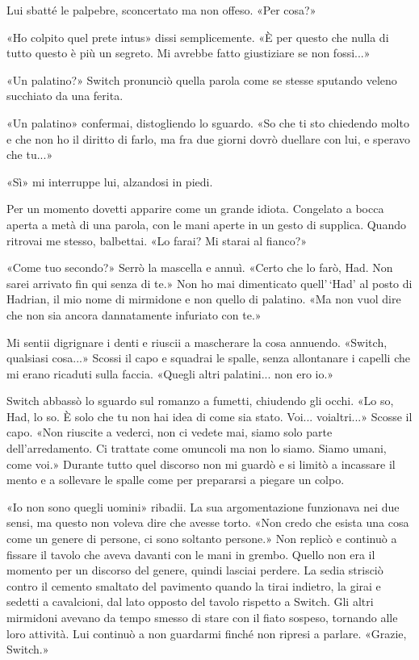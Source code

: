 Lui sbatté le palpebre, sconcertato ma non offeso. «Per cosa?»

«Ho colpito quel prete intus» dissi semplicemente. «È per questo che
nulla di tutto questo è più un segreto. Mi avrebbe fatto giustiziare se
non fossi...»

«Un palatino?» Switch pronunciò quella parola come se stesse sputando
veleno succhiato da una ferita.

«Un palatino» confermai, distogliendo lo sguardo. «So che ti sto
chiedendo molto e che non ho il diritto di farlo, ma fra due giorni
dovrò duellare con lui, e speravo che tu...»

«Sì» mi interruppe lui, alzandosi in piedi.

Per un momento dovetti apparire come un grande idiota. Congelato a bocca
aperta a metà di una parola, con le mani aperte in un gesto di supplica.
Quando ritrovai me stesso, balbettai. «Lo farai? Mi starai al fianco?»

«Come tuo secondo?» Serrò la mascella e annuì. «Certo che lo farò, Had.
Non sarei arrivato fin qui senza di te.» Non ho mai dimenticato
quell'\,`Had' al posto di Hadrian, il mio nome di mirmidone e non quello
di palatino. «Ma non vuol dire che non sia ancora dannatamente infuriato
con te.»

Mi sentii digrignare i denti e riuscii a mascherare la cosa annuendo.
«Switch, qualsiasi cosa...» Scossi il capo e squadrai le spalle, senza
allontanare i capelli che mi erano ricaduti sulla faccia. «Quegli altri
palatini... non ero io.»

Switch abbassò lo sguardo sul romanzo a fumetti, chiudendo gli occhi.
«Lo so, Had, lo so. È solo che tu non hai idea di come sia stato. Voi...
voialtri...» Scosse il capo. «Non riuscite a vederci, non ci vedete mai,
siamo solo parte dell'arredamento. Ci trattate come omuncoli ma non lo
siamo. Siamo umani, come voi.» Durante tutto quel discorso non mi guardò
e si limitò a incassare il mento e a sollevare le spalle come per
prepararsi a piegare un colpo.

«Io non sono quegli uomini» ribadii. La sua argomentazione funzionava
nei due sensi, ma questo non voleva dire che avesse torto. «Non credo
che esista una cosa come un genere di persone, ci sono soltanto
persone.» Non replicò e continuò a fissare il tavolo che aveva davanti
con le mani in grembo. Quello non era il momento per un discorso del
genere, quindi lasciai perdere. La sedia strisciò contro il cemento
smaltato del pavimento quando la tirai indietro, la girai e sedetti a
cavalcioni, dal lato opposto del tavolo rispetto a Switch. Gli altri
mirmidoni avevano da tempo smesso di stare con il fiato sospeso,
tornando alle loro attività. Lui continuò a non guardarmi finché non
ripresi a parlare. «Grazie, Switch.»

